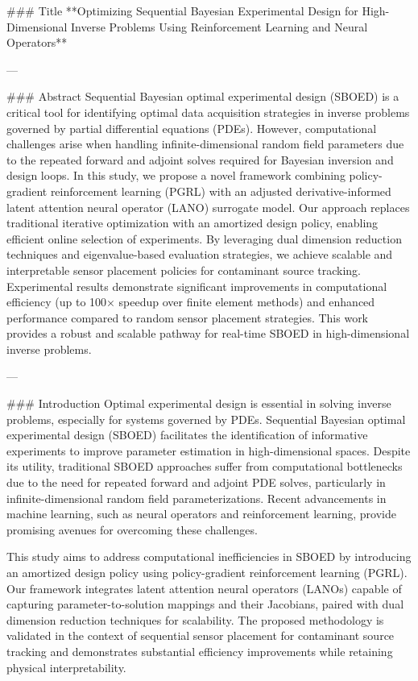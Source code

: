 ### Title
**Optimizing Sequential Bayesian Experimental Design for High-Dimensional Inverse Problems Using Reinforcement Learning and Neural Operators**

---

### Abstract
Sequential Bayesian optimal experimental design (SBOED) is a critical tool for identifying optimal data acquisition strategies in inverse problems governed by partial differential equations (PDEs). However, computational challenges arise when handling infinite-dimensional random field parameters due to the repeated forward and adjoint solves required for Bayesian inversion and design loops. In this study, we propose a novel framework combining policy-gradient reinforcement learning (PGRL) with an adjusted derivative-informed latent attention neural operator (LANO) surrogate model. Our approach replaces traditional iterative optimization with an amortized design policy, enabling efficient online selection of experiments. By leveraging dual dimension reduction techniques and eigenvalue-based evaluation strategies, we achieve scalable and interpretable sensor placement policies for contaminant source tracking. Experimental results demonstrate significant improvements in computational efficiency (up to 100× speedup over finite element methods) and enhanced performance compared to random sensor placement strategies. This work provides a robust and scalable pathway for real-time SBOED in high-dimensional inverse problems.

---

### Introduction
Optimal experimental design is essential in solving inverse problems, especially for systems governed by PDEs. Sequential Bayesian optimal experimental design (SBOED) facilitates the identification of informative experiments to improve parameter estimation in high-dimensional spaces. Despite its utility, traditional SBOED approaches suffer from computational bottlenecks due to the need for repeated forward and adjoint PDE solves, particularly in infinite-dimensional random field parameterizations. Recent advancements in machine learning, such as neural operators and reinforcement learning, provide promising avenues for overcoming these challenges. 

This study aims to address computational inefficiencies in SBOED by introducing an amortized design policy using policy-gradient reinforcement learning (PGRL). Our framework integrates latent attention neural operators (LANOs) capable of capturing parameter-to-solution mappings and their Jacobians, paired with dual dimension reduction techniques for scalability. The proposed methodology is validated in the context of sequential sensor placement for contaminant source tracking and demonstrates substantial efficiency improvements while retaining physical interpretability.


